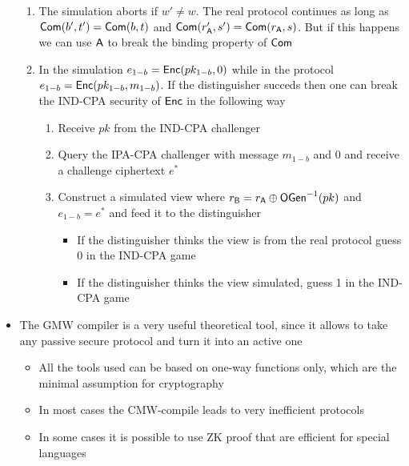 \begin{itemize}
    \begin{enumerate}
        \item The simulation aborts if $w' \neq w$. The real protocol continues as long as $\mathsf{Com}(b',t') = \mathsf{Com}(b,t)$ and $\mathsf{Com}(r_{\mathsf{A}}', s') = \mathsf{Com}(r_{\mathsf{A}}, s)$. But if this happens we can use $\mathsf{A}$ to break the binding property of $\mathsf{Com}$
        \item In the simulation $e_{1-b} = \mathsf{Enc}(pk_{1-b}, 0)$ while in the protocol $e_{1-b} = \mathsf{Enc}(pk_{1-b}, m_{1-b})$. If the distinguisher succeds then one can break the IND-CPA security of $\mathsf{Enc}$ in the following way
        \begin{enumerate}
            \item Receive $pk$ from the IND-CPA challenger
            \item Query the IPA-CPA challenger with message $m_{1-b}$ and $0$ and receive a challenge ciphertext $e^*$
            \item Construct a simulated view where $r_{\mathsf{B}} = r_{\mathsf{A}} \oplus \mathsf{OGen}^{-1}(pk)$ and $e_{1-b} = e^*$ and feed it to the distinguisher
            \begin{itemize}
                \item If the distinguisher thinks the view is from the real protocol guess $0$ in the IND-CPA game
                \item If the distinguisher thinks the view simulated, guess 1 in the IND-CPA game
            \end{itemize}
        \end{enumerate}
    \end{enumerate}
    \item The GMW compiler is a very useful theoretical tool, since it allows to take any passive secure protocol and turn it into an active one
    \begin{itemize}
        \item All the tools used can be based on one-way functions only, which are the minimal assumption for cryptography
        \item In most cases the CMW-compile leads to very inefficient protocols
        \item In some cases it is possible to use ZK proof that are efficient for special languages
    \end{itemize}
\end{itemize}

